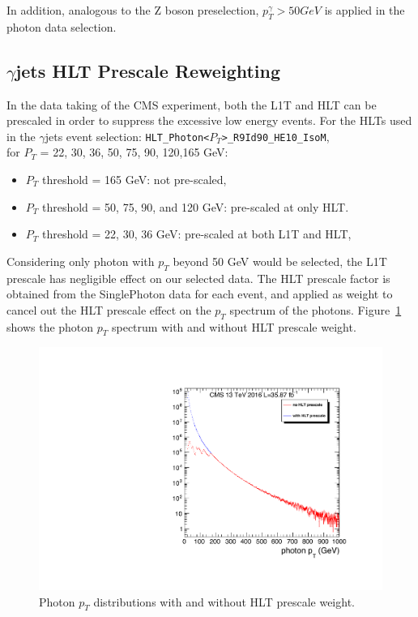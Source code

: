 In addition, analogous to the Z boson preselection, $p_T ^{\gamma} > 50GeV$ is applied in the photon data selection.

\subsection{$\gamma$jets HLT Prescale Reweighting}
In the data taking of the CMS experiment, both the L1T and HLT can be prescaled in order to suppress the excessive low energy events. For the HLTs used in the $\gamma$jets event selection:
\texttt{HLT\_Photon<$P_T$>\_R9Id90\_HE10\_IsoM}, \\
 for $P_T$ = 22, 30, 36, 50, 75, 90, 120,165 GeV:
\begin{itemize}
\item $P_T$ threshold = 165 GeV: not pre-scaled, 
\item $P_T$ threshold = 50, 75, 90, and 120 GeV:  pre-scaled at only HLT.  
\item $P_T$ threshold = 22, 30, 36 GeV: pre-scaled at both L1T and HLT, 
\end{itemize}

Considering only photon with $p_T$ beyond 50 GeV would be selected, the L1T prescale has negligible effect on our selected data. The HLT prescale factor is obtained from the SinglePhoton data for each event, and applied as weight to cancel out the HLT prescale effect on the $p_T$ spectrum of the photons. Figure~\ref{fig:photon_pt_prescale} shows the photon $p_T$ spectrum with and without HLT prescale weight.


\begin{figure}[htbp]
\begin{center}
\includegraphics[width=0.86\linewidth]{figures/bg_photonHLT_reweight.pdf}
\caption{Photon $p_T$ distributions with and without HLT prescale weight. }
\label{fig:photon_pt_prescale}
\end{center}
\end{figure}


